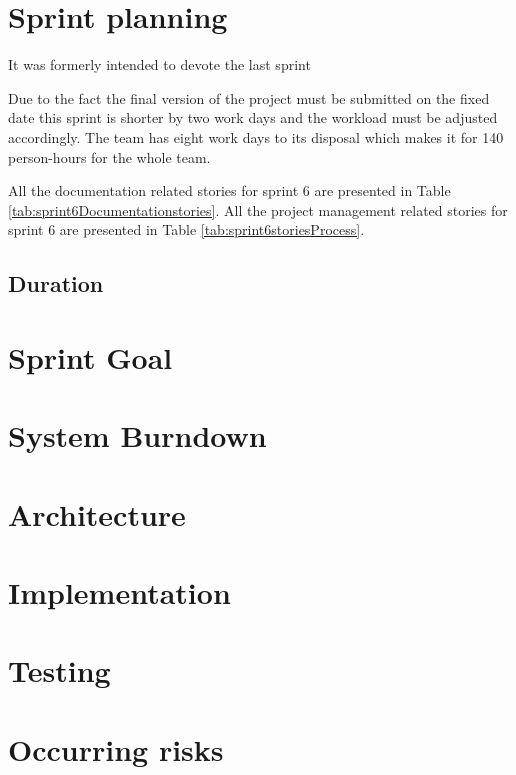 \section{Sprint planning}
It was formerly intended to devote the last sprint

Due to the fact the final version of the project must be submitted on the fixed date this sprint is shorter by two work days and the workload must be adjusted accordingly. The team has eight work days to its disposal which makes it for 140 person-hours for the whole team.

All the documentation related stories for sprint 6 are presented in Table \ref{tab:sprint6Documentationstories}. 
 All the project management related stories for sprint 6 are presented in Table \ref{tab:sprint6storiesProcess}.


\subsection{Duration}

\section{Sprint Goal}

\section{System Burndown}

\section{Architecture}
\section{Implementation}
\section{Testing}
\section{Occurring risks}
